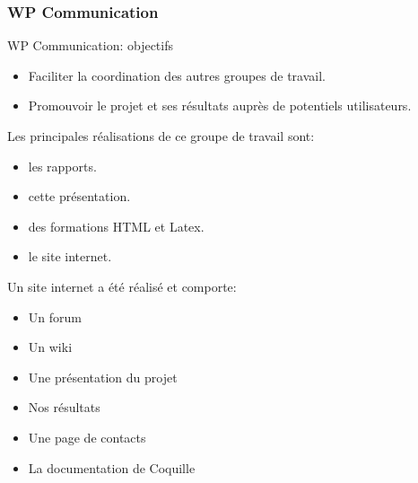 \begin{frame}
\frametitle{WP Communication} 

WP Communication: objectifs
\begin{itemize}
    \item Faciliter la coordination des autres groupes de travail.
    \item Promouvoir le projet et ses résultats auprès de potentiels utilisateurs.
\end{itemize}


\end{frame}


\begin{frame}

Les principales réalisations de ce groupe de travail sont:
\begin{itemize}
 
    \item les rapports. %
    \item cette présentation.
    \item des formations HTML et Latex. %
    \item le site internet.

\end{itemize}
\end{frame}



\begin{frame}
Un site internet a été réalisé et comporte:
\begin{itemize}
    \item Un forum 
    \item Un wiki
    \item Une présentation du projet 
    \item Nos résultats
    \item Une page de contacts
    \item La documentation de Coquille %
\end{itemize}


\end{frame}
